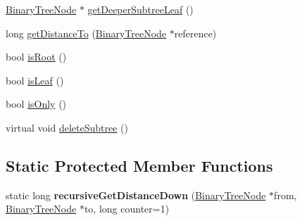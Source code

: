\begin{DoxyCompactItemize}
\item 
\hyperlink{classDataJuggler_1_1BinaryTreeNode}{Binary\+Tree\+Node} $\ast$ \hyperlink{classDataJuggler_1_1BinaryTreeNode_a7e0d717313cf4ca8fe28e9663dd2c299}{get\+Deeper\+Subtree\+Leaf} ()
\item 
long \hyperlink{classDataJuggler_1_1BinaryTreeNode_a0ee7e550e37a7882e5bab3be3fac1a42}{get\+Distance\+To} (\hyperlink{classDataJuggler_1_1BinaryTreeNode}{Binary\+Tree\+Node} $\ast$reference)
\item 
bool \hyperlink{classDataJuggler_1_1BinaryTreeNode_a51c9d0cc830439528546be1d2c42ce72}{is\+Root} ()
\item 
bool \hyperlink{classDataJuggler_1_1BinaryTreeNode_a6716143fcaf85866773b85f3342114d9}{is\+Leaf} ()
\item 
bool \hyperlink{classDataJuggler_1_1BinaryTreeNode_a2ca8921083f09fdc947bfc8be1af834a}{is\+Only} ()
\item 
virtual void \hyperlink{classDataJuggler_1_1BinaryTreeNode_a563663d605400e2a928df19fd086bf9a}{delete\+Subtree} ()
\end{DoxyCompactItemize}
\subsection*{Static Protected Member Functions}
\begin{DoxyCompactItemize}
\item 
\mbox{\label{classDataJuggler_1_1BinaryTreeNode_a6c7ea66bec6d5371e4a065b859f53939}} 
static long {\bfseries recursive\+Get\+Distance\+Down} (\hyperlink{classDataJuggler_1_1BinaryTreeNode}{Binary\+Tree\+Node} $\ast$from, \hyperlink{classDataJuggler_1_1BinaryTreeNode}{Binary\+Tree\+Node} $\ast$to, long counter=1)
\end{DoxyCompactItemize}
